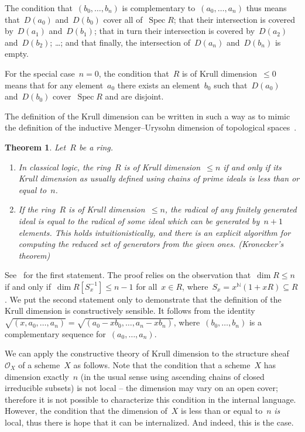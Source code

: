\documentclass[10pt,reqno,a4paper]{amsbook}
\makeatletter
\theoremstyle{definition}
\theoremstyle{plain}
\newtheorem{thm}[defn]{Theorem}
\theoremstyle{remark}
\renewcommand{\O}{\mathcal{O}}
\newcommand{\NN}{\mathbb{N}}
\DeclareMathOperator{\Spec}{Spec}
\newcommand{\?}{\,{:}\,}
\renewcommand{\_}{\mathpunct{.}\,}
\renewenvironment{proof}[1][\proofname]{\par
  \pushQED{\qed}%
  \normalfont \topsep6\p@\@plus6\p@\relax
  \trivlist
  \item[\hskip\labelsep
        \itshape
    #1\@addpunct{.}]\ignorespaces
}{%
  \popQED\endtrivlist\@endpefalse
}
\makeatother
\begin{document}
The condition that~$(b_0,\ldots,b_n)$ is complementary to~$(a_0,\ldots,a_n)$
thus means that~$D(a_0)$ and~$D(b_0)$ cover all of~$\Spec R$; that their
intersection is covered by~$D(a_1)$ and~$D(b_1)$; that in turn their
intersection is covered by~$D(a_2)$ and~$D(b_2)$; \ldots; and that finally, the
intersection of~$D(a_n)$ and~$D(b_n)$ is empty.

For the special case~$n = 0$, the condition that~$R$ is of Krull
dimension~$\leq 0$ means that for any element~$a_0$ there exists an
element~$b_0$ such that~$D(a_0)$ and~$D(b_0)$ cover~$\Spec R$ and are disjoint.

The definition of the Krull dimension can be written in such a way as to mimic the
definition of the inductive Menger--Urysohn dimension of topological
spaces~\cite[Section~1]{dyn:krull-integral}.

\begin{thm}Let~$R$ be a ring.
\begin{enumerate}
\item In classical logic, the ring~$R$ is
of Krull dimension~$\leq n$ if and only if its Krull dimension
as usually defined using chains of prime ideals is less than or equal to~$n$.
\item If the ring~$R$ is
of Krull dimension~$\leq n$, the radical of any finitely generated ideal is
equal to the radical of some ideal which can be generated by~$n+1$ elements.
This holds intuitionistically, and there is an explicit algorithm for computing
the reduced set of generators from the given ones. (Kronecker's theorem)
\end{enumerate}
\end{thm}
\begin{proof}See~\cite[Theorem~1.2]{dyn:krull-integral} for the first
statement. The proof relies on the observation that~$\dim R \leq n$ if and only
if~$\dim R[S_x^{-1}] \leq n-1$ for all~$x \in R$, where~$S_x = x^\NN (1+xR)
\subseteq R$. We put the second statement only to demonstrate that the
definition of the Krull dimension is constructively sensible. It follows from
the identity~$\sqrt{(x,a_0,\ldots,a_n)} =
\sqrt{(a_0-xb_0,\ldots,a_n-xb_n)}$, where~$(b_0,\ldots,b_n)$ is a complementary
sequence for~$(a_0,\ldots,a_n)$.
\end{proof}

We can apply the constructive theory of Krull dimension to the structure
sheaf~$\O_X$ of a scheme~$X$ as follows. Note that the condition that a
scheme~$X$ has dimension exactly~$n$ (in the usual sense using ascending chains
of closed irreducible subsets) is not local -- the dimension may vary on
an open cover; therefore it is not possible to characterize this condition in
the internal language. However, the condition that the dimension of~$X$ is less
than or equal to~$n$ \emph{is} local, thus there is hope that it can be
internalized. And indeed, this is the case.
\end{document}
